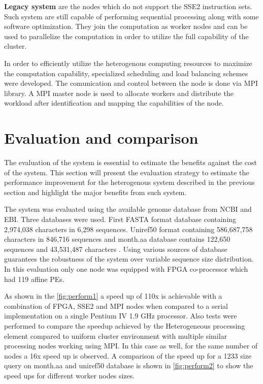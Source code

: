 \documentclass[12pt,twoside]{article}
\begin{document}
\textbf{Legacy system} are the nodes which do not support the SSE2 instruction sets. Such system are still capable of performing
sequential processing along with some software optimization. They join the computation as worker nodes and can be used to parallelize
the computation in order to utilize the full capability of the cluster.

In order to efficiently utilize the heterogenous computing resources to maximize the computation capability,
specialized scheduling and load balancing schemes were developed. The comunication and control between the node is done via MPI library.
A MPI master node is used to allocate workers and distribute the workload after identification and mapping the capabilities of the node.

\section{Evaluation and comparison}
\label{sec:eval}

The evaluation of the system is essential to estimate the benefits against the cost of the system. This section will present the evaluation
strategy to estimate the performance improvement for the heterogenous system described in the previous section and highlight the major
benefits from such system.

The system was evaluated using the available genome database from NCBI and EBI. Three databases were used. First FASTA format database
containing 2,974,038 characters in 6,298 sequences. Uniref50 format containing 586,687,758 characters in
846,716 sequences and month.aa database contains 122,650 sequences and 43,531,487 characters  \cite{meng_high-performance_2010}.
Using various sources of database guarantees
the robustness of the system over variable sequence size distribution. In this evaluation only one node was equipped with FPGA co-processor
which had 119 affine PEs.

As shown in the \cref{fig:perform1} a speed up of 110x is achievable with a combination of FPGA, SSE2 and MPI nodes when compared
to a serial implementation on a single Pentium IV 1.9 GHz processor. Also tests were performed to compare the speedup achieved by the 
Heterogeneous processing element compared to uniform cluster environment with multiple similar processing nodes working using MPI.
In this case as well, for the same number of nodes a 16x speed up is observed. A comparison of the speed up for a 1233 size query on month.aa and 
uniref50 database is shown in \cref{fig:perform2} to show the speed ups for different worker nodes sizes.
\end{document}
